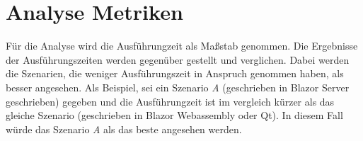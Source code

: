 \section{Analyse Metriken}
\label{sec:metriken}
Für die Analyse wird die Ausführungzeit als
Maßstab genommen. Die Ergebnisse der Ausführungszeiten werden gegenüber gestellt und
verglichen. Dabei werden die Szenarien, die weniger Ausführungszeit in Anspruch genommen haben,
als besser angesehen.
\newline
\newline
Als Beispiel, sei ein Szenario \emph{A} (geschrieben in Blazor Server geschrieben) gegeben und die
Ausführungzeit ist im vergleich kürzer als das gleiche Szenario (geschrieben in Blazor Webassembly
oder Qt). In diesem Fall würde das Szenario \emph{A} als das beste angesehen werden.